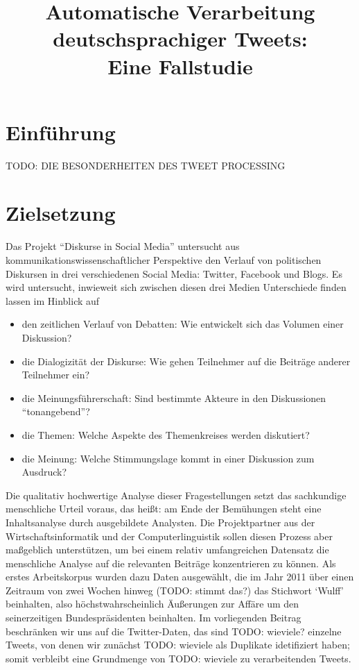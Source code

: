 \documentclass[11pt]{article}
\title{Automatische Verarbeitung deutschsprachiger Tweets:\\ Eine Fallstudie}
\author{}
\date{}
\begin{document}
\maketitle

\thispagestyle{empty}




\section{Einführung}

TODO: DIE BESONDERHEITEN DES TWEET PROCESSING


\section{Zielsetzung}

Das Projekt ``Diskurse in Social Media'' untersucht aus
kommunikationswissenschaftlicher Perspektive den Verlauf von
politischen Diskursen in drei verschiedenen Social Media: Twitter,
Facebook und Blogs. Es wird untersucht, inwieweit sich zwischen diesen
drei Medien Unterschiede finden lassen im Hinblick auf
\begin{itemize}
\item den zeitlichen Verlauf von Debatten: Wie entwickelt sich das
  Volumen einer Diskussion?
\item die Dialogizität der Diskurse: Wie gehen Teilnehmer auf die
  Beiträge anderer Teilnehmer ein?
\item die Meinungsführerschaft: Sind bestimmte Akteure in den
  Diskussionen ``tonangebend''?
\item die Themen: Welche Aspekte des Themenkreises werden diskutiert?
\item die Meinung: Welche Stimmungslage kommt in einer Diskussion zum Ausdruck?
\end{itemize}
Die qualitativ hochwertige Analyse dieser Fragestellungen setzt das sachkundige
menschliche Urteil voraus, das heißt: am Ende der Bemühungen steht
eine Inhaltsanalyse durch ausgebildete Analysten. Die Projektpartner
aus der Wirtschaftsinformatik und der Computerlinguistik sollen diesen
Prozess aber maßgeblich unterstützen, um bei einem relativ
umfangreichen Datensatz die menschliche Analyse auf die relevanten
Beiträge konzentrieren zu können. Als erstes Arbeitskorpus wurden dazu
Daten ausgewählt, die im Jahr 2011 über einen Zeitraum von zwei Wochen
hinweg (TODO: stimmt das?) das Stichwort `Wulff' beinhalten, also
höchstwahrscheinlich Äußerungen zur Affäre um den seinerzeitigen
Bundespräsidenten beinhalten. Im vorliegenden Beitrag beschränken wir
uns auf die Twitter-Daten, das sind TODO: wieviele? einzelne Tweets,
von denen wir zunächst TODO: wieviele als Duplikate idetifiziert
haben; somit verbleibt eine Grundmenge von TODO: wieviele zu
verarbeitenden Tweets.
\end{document}
